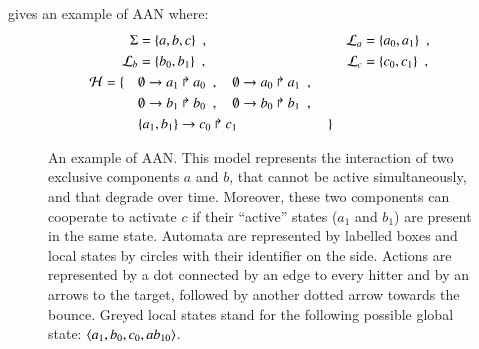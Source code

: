 \begin{example}
   gives an example of AAN where:
  \begin{align*}
    \Sigma &= \{ a, b, c \} \enspace,
      & \mathcal{L}_a &= \{ a_0, a_1 \} \enspace, \\
    \mathcal{L}_b &= \{ b_0, b_1 \} \enspace,
      & \mathcal{L}_c &= \{ c_0, c_1 \} \enspace, \\
    \mathcal{H} = \{ \quad
      & \emptyset\rightarrow a_1\Rsh a_0 \enspace , \quad
        \emptyset\rightarrow a_0\Rsh a_1 \enspace , \\
      & \emptyset\rightarrow b_1\Rsh b_0 \enspace , \quad
        \emptyset\rightarrow b_0\Rsh b_1 \enspace , \\
      & \{a_1, b_1\}\rightarrow c_0\Rsh c_1 \enspace \quad \qquad \qquad
      \quad \}
  \end{align*}

\begin{figure}[tb]
  \centering
  \caption{%
  \label{fig:ph-livelock}%
    An example of AAN.
    This model represents the interaction of two exclusive components $a$ and $b$,
    that cannot be active simultaneously, and that degrade over time.
    Moreover, these two components can cooperate to activate $c$
    if their “active” states ($a_1$ and $b_1$)
    are present in the same state.
    Automata are represented by labelled boxes
    and local states by circles with their identifier on the side.
    Actions are represented by a dot connected by an edge to every hitter
    and by an arrows to the target, followed by another dotted arrow towards the bounce.
    Greyed local states stand for the following possible global state:
    $\mbox{$\langle a_1, b_0, c_0, ab_{10} \rangle$}$.
  }
\end{figure}

\end{example}



